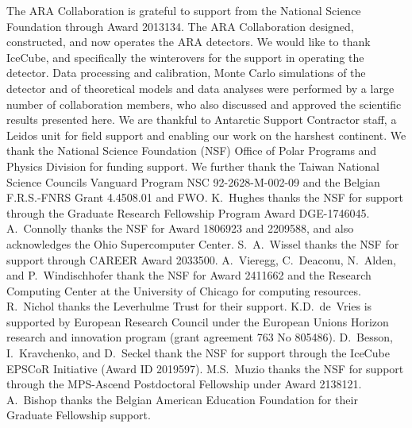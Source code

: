 \noindent
The ARA Collaboration is grateful to support from the National Science Foundation through Award 2013134.
The ARA Collaboration designed, constructed, and now operates the ARA detectors. 
We would like to thank IceCube, and specifically the winterovers for the support in operating the detector. 
Data processing and calibration, Monte Carlo simulations of the detector and of theoretical models and data analyses were performed by a large number
of collaboration members, who also discussed and approved the scientific results presented here. 
We are thankful to Antarctic Support Contractor staff, a Leidos unit for field support and enabling our work on the harshest continent. 
We thank the National Science Foundation (NSF) Office of Polar Programs and Physics Division for funding support. 
We further thank the Taiwan National Science Councils Vanguard Program NSC 92-2628-M-002-09 and the Belgian F.R.S.-FNRS Grant 4.4508.01 and FWO. 
K.~Hughes thanks the NSF for support through the Graduate Research Fellowship Program Award DGE-1746045. 
A.~Connolly thanks the NSF for Award 1806923 and 2209588, and also acknowledges the Ohio Supercomputer Center. 
S.~A.~Wissel thanks the NSF for support through CAREER Award 2033500.
A.~Vieregg, C.~Deaconu, N.~Alden, and P.~Windischhofer thank the NSF for Award 2411662 and the Research Computing Center at the University of Chicago
for computing resources.
R.~Nichol thanks the Leverhulme Trust for their support. 
K.D.~de~Vries is supported by European Research Council under the European Unions Horizon research and innovation program (grant agreement 763 No 805486). 
D.~Besson, I.~Kravchenko, and D.~Seckel thank the NSF for support through the IceCube EPSCoR Initiative (Award ID 2019597). 
M.S.~Muzio thanks the NSF for support through the MPS-Ascend Postdoctoral Fellowship under Award 2138121. 
A.~Bishop thanks the Belgian American Education Foundation for their Graduate Fellowship support.
